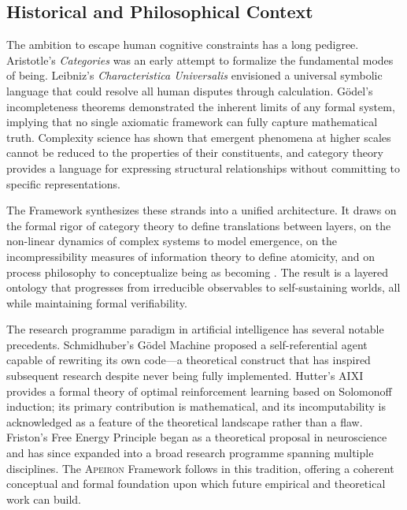 \subsection{Historical and Philosophical Context}
\label{subsec:context}

The ambition to escape human cognitive constraints has a long pedigree. Aristotle's \textit{Categories} \cite{aristotle1984} was an early attempt to formalize the fundamental modes of being. Leibniz's \textit{Characteristica Universalis} \cite{leibniz1996} envisioned a universal symbolic language that could resolve all human disputes through calculation. Gödel's incompleteness theorems \cite{godel1986} demonstrated the inherent limits of any formal system, implying that no single axiomatic framework can fully capture mathematical truth. Complexity science \cite{mitchell2009} has shown that emergent phenomena at higher scales cannot be reduced to the properties of their constituents, and category theory \cite{maclane1971} provides a language for expressing structural relationships without committing to specific representations.

The \Apeiron{} Framework synthesizes these strands into a unified architecture. It draws on the formal rigor of category theory to define translations between layers, on the non-linear dynamics of complex systems to model emergence, on the incompressibility measures of information theory to define atomicity, and on process philosophy to conceptualize being as becoming \cite{simondon1992}. The result is a layered ontology that progresses from irreducible observables to self-sustaining worlds, all while maintaining formal verifiability.

The research programme paradigm in artificial intelligence has several notable precedents. Schmidhuber's Gödel Machine \cite{schmidhuber2007} proposed a self-referential agent capable of rewriting its own code---a theoretical construct that has inspired subsequent research despite never being fully implemented. Hutter's AIXI \cite{hutter2005} provides a formal theory of optimal reinforcement learning based on Solomonoff induction; its primary contribution is mathematical, and its incomputability is acknowledged as a feature of the theoretical landscape rather than a flaw. Friston's Free Energy Principle \cite{friston2010} began as a theoretical proposal in neuroscience and has since expanded into a broad research programme spanning multiple disciplines. The \textsc{Apeiron} Framework follows in this tradition, offering a coherent conceptual and formal foundation upon which future empirical and theoretical work can build.

